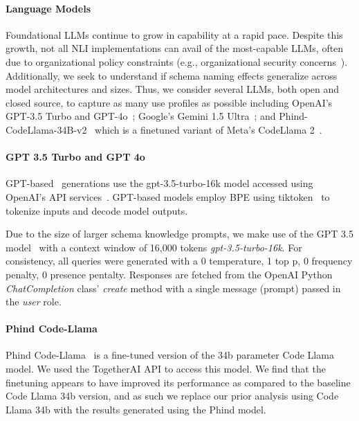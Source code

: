 \paragraph{\textbf{Language Models}}
Foundational LLMs continue to grow in capability at a rapid pace.
Despite this growth, not all NLI implementations can avail of the most-capable LLMs, often due to organizational policy constraints (e.g., organizational security concerns~\cite{gsa-llm-directive}).
Additionally, we seek to understand if schema naming effects generalize across model architectures and sizes.
Thus, we consider several LLMs, both open and closed source, to capture as many use profiles as possible including OpenAI's GPT-3.5 Turbo and GPT-4o~\cite{openai-chatgpt-blog-post, openai-api-documentation}; Google's Gemini 1.5 Ultra~\cite{geminiteam2024gemini, geminiteam2024gemini15}; and Phind-CodeLlama-34B-v2~\cite{phind2022phindcodellama} which is a finetuned variant of Meta's CodeLlama 2~\cite{roziere2023code}.

\paragraph{GPT 3.5 Turbo and GPT 4o}
GPT-based~\cite{openai-chatgpt-blog-post} generations use the gpt-3.5-turbo-16k model accessed using OpenAI's API services~\cite{openai-api-documentation}. 
GPT-based models employ BPE using tiktoken~\cite{openai-tokenizer} to tokenize inputs and decode model outputs.

Due to the size of larger schema knowledge prompts, we make use of the GPT 3.5 model~\cite{openai-chatgpt-blog-post} with a context window of 16,000 tokens \emph{gpt-3.5-turbo-16k}.
For consistency, all queries were generated with a 0 temperature, 1 top p, 0 frequency penalty, 0 presence pentalty.
Responses are fetched from the OpenAI Python \emph{ChatCompletion} class' \emph{create} method with a single message (prompt) passed in the \emph{user} role. 

\paragraph{Phind Code-Llama}
Phind Code-Llama~\cite{phind2022phindcodellama} is a fine-tuned version of the 34b parameter Code Llama model.
We used the TogetherAI API to access this model.
We find that the finetuning appears to have improved its performance as compared to the baseline Code Llama 34b version, and as such we replace our prior analysis using Code Llama 34b with the results generated using the Phind model.


